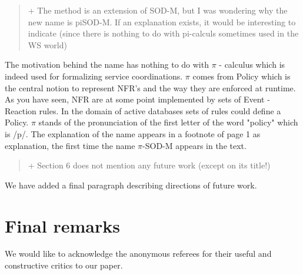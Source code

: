 \documentclass[12pt,a4wide]{article}
\begin{document}
\begin{quotation}\sf\footnotesize

+ The method is an extension of SOD-M, but I was wondering why the new name is piSOD-M. If an explanation exists, it would be interesting to indicate (since there is nothing to do with pi-calculs sometimes used in the WS world) 
\end{quotation}

\noindent 
The motivation behind the name has nothing to do with $\pi$ - calculus which is indeed used for formalizing service coordinations. $\pi$ comes from Policy which is the central notion to represent  NFR's and the way they are enforced at runtime. As you have seen, NFR are at some point implemented by sets of Event - Reaction rules. In the domain of active databases sets of rules could define a Policy. $\pi$ stands of the pronunciation of the first letter of the word "policy" which is /p/. The explanation of the name appears in a footnote of page 1 as explanation, the first time the name $\pi$-SOD-M appears in the text. 


\begin{quotation}\sf\footnotesize

+ Section 6 does not mention any future work (except on its title!) 

\end{quotation}

\noindent 
We have added a final paragraph describing directions of future work.



\section*{Final remarks}

We would like to acknowledge the anonymous referees for their useful and constructive critics to our paper.


  
\end{document}
